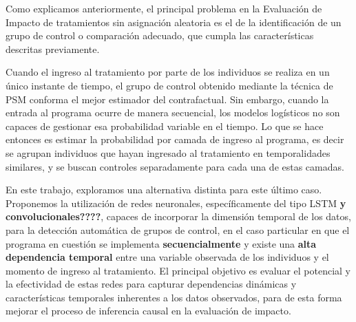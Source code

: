 \documentclass[../main.tex]{subfiles}
\begin{document}

Como explicamos anteriormente, el principal problema en la Evaluación de Impacto de tratamientos sin asignación aleatoria es el de la identificación de un grupo de control o comparación adecuado, que cumpla las características descritas previamente.

Cuando el ingreso al tratamiento por parte de los individuos se realiza en un único instante de tiempo, el grupo de control obtenido mediante la técnica de PSM conforma el mejor estimador del contrafactual. Sin embargo, cuando la entrada al programa ocurre de manera secuencial, los modelos logísticos no son capaces de gestionar esa probabilidad variable en el tiempo. Lo que se hace entonces es estimar la probabilidad por camada de ingreso al programa, es decir se agrupan individuos que hayan ingresado al tratamiento en temporalidades similares, y se buscan controles separadamente para cada una de estas camadas. 

En este trabajo, exploramos una alternativa distinta para este último caso. Proponemos la utilización de redes neuronales, específicamente del tipo LSTM \textbf{y convolucionales????}, capaces de incorporar la dimensión temporal de los datos, para la detección automática de grupos de control, en el caso particular en que el programa en cuestión se implementa \textbf{secuencialmente} y existe una \textbf{alta dependencia temporal} entre una variable observada de los individuos y el momento de ingreso al tratamiento. El principal objetivo es evaluar el potencial y la efectividad de estas redes para capturar dependencias dinámicas y características temporales inherentes a los datos observados, para de esta forma mejorar el proceso de inferencia causal en la evaluación de impacto.  

\end{document}
